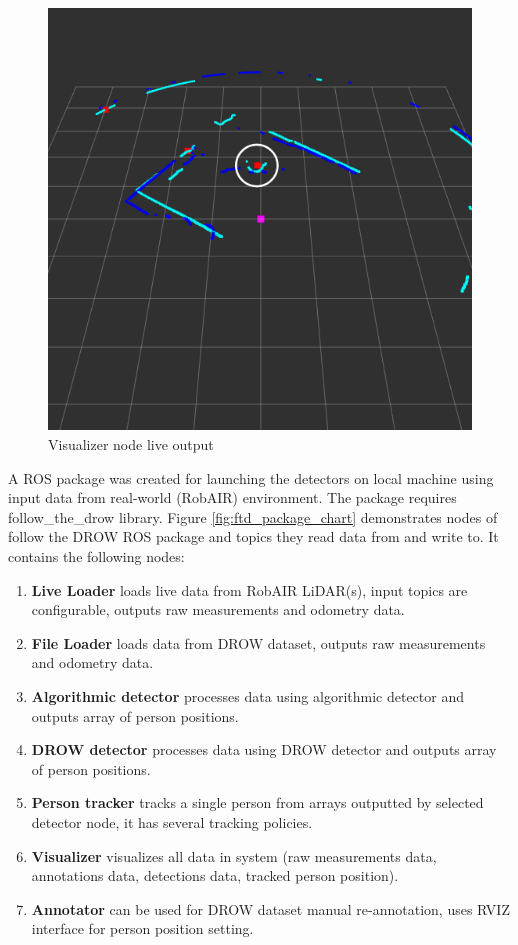 \documentclass{article}
\begin{document}
\begin{figure}[b!]
	\centering
	\includegraphics[width=0.75\linewidth]{ftd_live_output}
	\caption{Visualizer node live output}
	\label{fig:visualizer_node_live}
\end{figure}

A ROS package was created for launching the detectors on local machine using input data from real-world (RobAIR) environment.
The package requires follow\_the\_drow library.
Figure \ref{fig:ftd_package_chart} demonstrates nodes of follow the DROW ROS package and topics they read data from and write to.
It contains the following nodes:

\begin{enumerate}
	\item \textbf{Live Loader} loads live data from RobAIR LiDAR(s), input topics are configurable, outputs raw measurements and odometry data.
	\item \textbf{File Loader} loads data from DROW dataset, outputs raw measurements and odometry data.
	\item \textbf{Algorithmic detector} processes data using algorithmic detector and outputs array of person positions.
	\item \textbf{DROW detector} processes data using DROW detector and outputs array of person positions.
	\item \textbf{Person tracker} tracks a single person from arrays outputted by selected detector node, it has several tracking policies.
	\item \textbf{Visualizer} visualizes all data in system (raw measurements data, annotations data, detections data, tracked person position).
	\item \textbf{Annotator} can be used for DROW dataset manual re-annotation, uses RVIZ interface for person position setting.
\end{enumerate}
\end{document}
